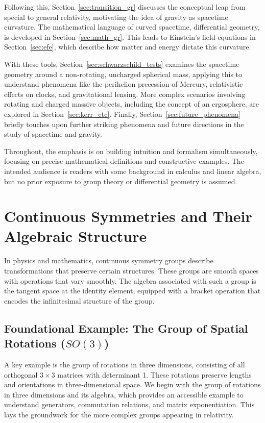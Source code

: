 \documentclass{amsart}
\theoremstyle{definition}
\theoremstyle{remark}
\begin{document}
Following this, Section~\ref{sec:transition_gr} discusses the conceptual leap from special to general relativity, motivating the idea of gravity as spacetime curvature. The mathematical language of curved spacetime, differential geometry, is developed in Section~\ref{sec:math_gr}. This leads to Einstein's field equations in Section~\ref{sec:efe}, which describe how matter and energy dictate this curvature.

With these tools, Section~\ref{sec:schwarzschild_tests} examines the spacetime geometry around a non-rotating, uncharged spherical mass, applying this to understand phenomena like the perihelion precession of Mercury, relativistic effects on clocks, and gravitational lensing. More complex scenarios involving rotating and charged massive objects, including the concept of an ergosphere, are explored in Section~\ref{sec:kerr_etc}. Finally, Section~\ref{sec:future_phenomena} briefly touches upon further striking phenomena and future directions in the study of spacetime and gravity.

Throughout, the emphasis is on building intuition and formalism simultaneously, focusing on precise mathematical definitions and constructive examples. The intended audience is readers with some background in calculus and linear algebra, but no prior exposure to group theory or differential geometry is assumed.

\section{Continuous Symmetries and Their Algebraic Structure}
\label{sec:cont_symm}

In physics and mathematics, continuous symmetry groups describe transformations that preserve certain structures. These groups are smooth spaces with operations that vary smoothly. The algebra associated with such a group is the tangent space at the identity element, equipped with a bracket operation that encodes the infinitesimal structure of the group.

\subsection{Foundational Example: The Group of Spatial Rotations ($SO(3)$)}
\label{subsec:so3}
A key example is the group of rotations in three dimensions, consisting of all orthogonal $3 \times 3$ matrices with determinant 1. These rotations preserve lengths and orientations in three-dimensional space. We begin with the group of rotations in three dimensions and its algebra, which provides an accessible example to understand generators, commutation relations, and matrix exponentiation. This lays the groundwork for the more complex groups appearing in relativity.
\end{document}
